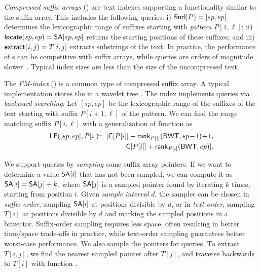 \emph{Compressed suffix arrays} (\CSA) \cite{Sadakane2003,Ferragina2005a,Grossi2005} are
text indexes supporting a functionality similar to the suffix array. This
includes the following queries: i) $\mathsf{find}(P) = [sp,ep]$ determines the
lexicographic range of suffixes starting with \emph{pattern} $P[1,\ell]$; ii)
$\mathsf{locate}(sp,ep) = \mathsf{SA}[sp,ep]$ returns the starting positions of these
suffixes; and iii) $\mathsf{extract}(i,j) = T[i,j]$ extracts substrings of the text.
In practice, the \find{} performance of {\CSA}s can be
competitive with suffix arrays, while \locate{} queries are orders of
magnitude slower~\cite{Ferragina2009a}. Typical index sizes are less than the
size of the uncompressed text.

The \emph{FM-index} (\FMI) \cite{Ferragina2005a} is a common type of
compressed suffix array. A typical implementation \cite{Ferragina2007a}
stores the \BWT{} in a
wavelet tree \cite{Grossi2003}. The index implements \find{} queries via
\emph{backward searching}. Let $[sp,ep]$ be the lexicographic
range of the suffixes of the text starting with suffix $P[i+1,\ell]$ of the
pattern. We can find the range matching suffix $P[i,\ell]$ with a
generalization of function \LF{} as
\begin{eqnarray*}
\mLF([sp,ep],P[i]) &\!\!\!=\!\!\!&
[\mC[P[i]] + \mrank_{P[i]}(\mBWT, sp\!-\!1) \!+\! 1, \\
&& \,\,\mC[P[i]] + \mrank_{P[i]}(\mBWT, ep)].
\end{eqnarray*}

We support \locate{} queries by \emph{sampling} some suffix array pointers. If
we want to determine a value $\mathsf{SA}[i]$ that has not been sampled, we can
compute it as $\mathsf{SA}[i] = \mathsf{SA}[j]+k$, where $\mathsf{SA}[j]$ is a sampled pointer
found by iterating \LF{} $k$ times, starting from position $i$. Given
\emph{sample interval} $d$, the samples can be chosen in \emph{suffix order},
sampling $\mathsf{SA}[i]$ at positions divisible by $d$, or in \emph{text order},
sampling $T[i]$ at positions divisible by $d$ and marking the sampled \SA{}
positions in a bitvector. Suffix-order sampling requires less space, often
resulting in better time/space trade-offs in practice, while text-order
sampling guarantees better worst-case performance. We also sample the \ISA{}
pointers for \extract{} queries. To extract $T[i,j]$, we find the nearest
sampled pointer after $T[j]$, and traverse backwards to $T[i]$ with
function \LF.

